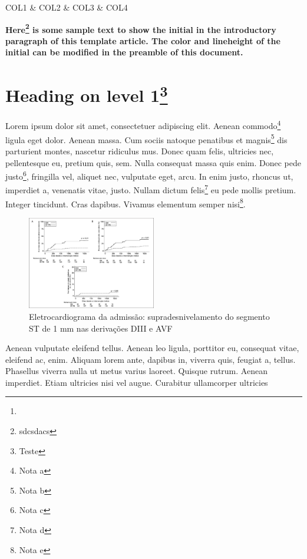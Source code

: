 
\begin{abstract}
  Cirero dixit\footnote{\lipsum[2]}\lipsum[1]
\end{abstract}


{
}
{ \FL
	COL1 & COL2 & COL3 & COL4 \NN
}

\textbf{Here\footnote{sdcsdacs} is some sample text to show the initial in the introductory paragraph of this template article. The color and lineheight of the initial can be modified in the preamble of this document.}

\section*{Heading on level 1\footnote{Teste}}
Lorem ipsum dolor sit amet, consectetuer adipiscing elit. Aenean commodo\footnote{Nota a} ligula
eget dolor. Aenean massa. Cum sociis natoque penatibus et magnis\footnote{Nota b} dis parturient
montes, nascetur ridiculus mus. Donec quam felis, ultricies nec, pellentesque
eu, pretium quis, sem. Nulla consequat massa quis enim. Donec pede justo\footnote{Nota c},
fringilla vel, aliquet nec, vulputate eget, arcu. In enim justo, rhoncus ut,
imperdiet a, venenatis vitae, justo. Nullam dictum felis\footnote{Nota d} eu pede mollis
pretium. Integer tincidunt. Cras dapibus. Vivamus elementum semper nisi\footnote{Nota e}. 

\par
\begin{figure}[h]
	\centering
	\includegraphics[width=0.5\textwidth]{temp.png}
	\caption{Eletrocardiograma da admissão: supradesnivelamento do segmento ST de 1 mm nas derivações DIII e AVF}
	\label{Figura 1 xxx}
\end{figure}

Aenean vulputate eleifend tellus. Aenean leo ligula, porttitor eu, consequat
vitae, eleifend ac, enim. Aliquam lorem ante, dapibus in, viverra quis, feugiat
a, tellus. Phasellus viverra nulla ut metus varius laoreet. Quisque rutrum.
Aenean imperdiet. Etiam ultricies nisi vel augue. Curabitur ullamcorper
ultricies 

